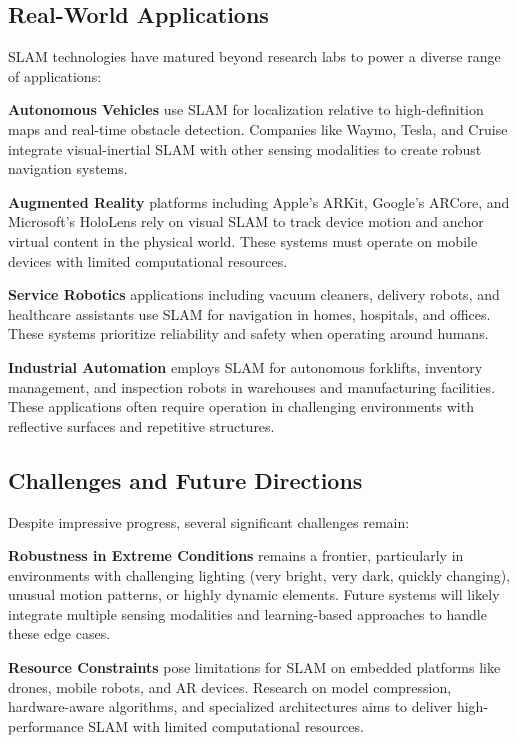 \documentclass[12pt]{article}
\begin{document}
    \newpage
    \subsection{Real-World Applications}
    
    SLAM technologies have matured beyond research labs to power a diverse range of applications:
    
    \textbf{Autonomous Vehicles} use SLAM for localization relative to high-definition maps and real-time obstacle detection. Companies like Waymo, Tesla, and Cruise integrate visual-inertial SLAM with other sensing modalities to create robust navigation systems.
    
    \textbf{Augmented Reality} platforms including Apple's ARKit, Google's ARCore, and Microsoft's HoloLens rely on visual SLAM to track device motion and anchor virtual content in the physical world. These systems must operate on mobile devices with limited computational resources.
    
    \textbf{Service Robotics} applications including vacuum cleaners, delivery robots, and healthcare assistants use SLAM for navigation in homes, hospitals, and offices. These systems prioritize reliability and safety when operating around humans.
    
    \textbf{Industrial Automation} employs SLAM for autonomous forklifts, inventory management, and inspection robots in warehouses and manufacturing facilities. These applications often require operation in challenging environments with reflective surfaces and repetitive structures.
        
    \subsection{Challenges and Future Directions}
    
    Despite impressive progress, several significant challenges remain:
    
    \textbf{Robustness in Extreme Conditions} remains a frontier, particularly in environments with challenging lighting (very bright, very dark, quickly changing), unusual motion patterns, or highly dynamic elements. Future systems will likely integrate multiple sensing modalities and learning-based approaches to handle these edge cases.
    
    \textbf{Resource Constraints} pose limitations for SLAM on embedded platforms like drones, mobile robots, and AR devices. Research on model compression, hardware-aware algorithms, and specialized architectures aims to deliver high-performance SLAM with limited computational resources.
    
\end{document}
